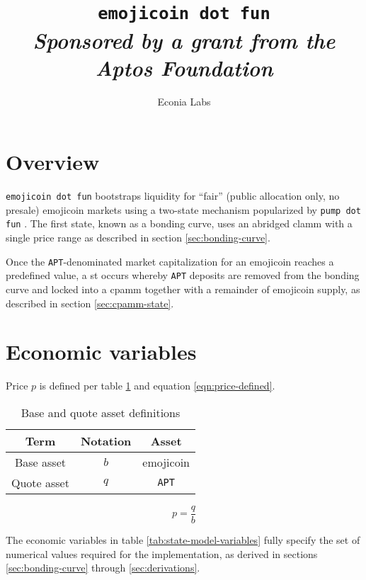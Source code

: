 \documentclass[table, twocolumn]{article}
\title{%
  \Huge \texttt{emojicoin dot fun} \\ \vspace{10pt}
  \small \emph{Sponsored by a grant from the Aptos Foundation}
}
\author{Econia Labs}
\date{}
\begin{document}
\maketitle

\section{Overview} \label{sec:overview}

\texttt{emojicoin dot fun} bootstraps liquidity for ``fair'' (public allocation only, no
presale) emojicoin \cite{emojicoin} markets using a two-state mechanism popularized
by \texttt{pump dot fun} \cite{pump}. The first state, known as a bonding curve, uses an
abridged \gls*{clamm} with a single price range \cite{univ3} as described in section
\ref{sec:bonding-curve}.

Once the \texttt{APT}-denominated \cite{octa} market capitalization for an emojicoin
reaches a predefined value, a \gls*{st} occurs whereby \texttt{APT} deposits are removed
from the bonding curve and locked into a \gls*{cpamm} \cite{univ2} together with a
remainder of emojicoin supply, as described in section \ref{sec:cpamm-state}.

\section{Economic variables}

Price $p$ is defined per table \ref{tab:b-q-definitions} and equation
\ref{eqn:price-defined}.

\begin{table}[!htb]
  \centering
  \begin{tabular}{|c|c|c|}
    \hline \rowcolor{blue}
    Term        & Notation & Asset        \\ \hline
    Base asset  & $b$      & emojicoin    \\ \hline
    Quote asset & $q$      & \texttt{APT} \\ \hline
  \end{tabular}
  \caption{Base and quote asset definitions}
  \label{tab:b-q-definitions}
\end{table}

\begin{equation} \label{eqn:price-defined}
  p = \frac{q}{b}
\end{equation}

The economic variables in table \ref{tab:state-model-variables} fully specify the set of
numerical values required for the implementation, as derived in sections
\ref{sec:bonding-curve} through \ref{sec:derivations}.
\end{document}
